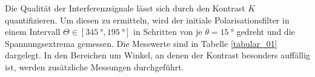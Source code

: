 \noindent Die Qualität der Interferenzsignale lässt sich durch den Kontrast $K$
quantifizieren. Um diesen zu ermitteln, wird der initiale Polarisationsfilter
in einem Intervall $\Theta \in [\SI{345}{\degree}, \SI{195}{\degree}]$
in Schritten von je $\theta = \SI{15}{\degree}$ gedreht und die Spannungsextrema
gemessen. Die Messwerte sind in Tabelle \ref{tabular_01} dargelegt. In den
Bereichen um Winkel, an denen der Kontrast besonders auffällig ist, werden
zusätzliche Messungen durchgeführt. 
